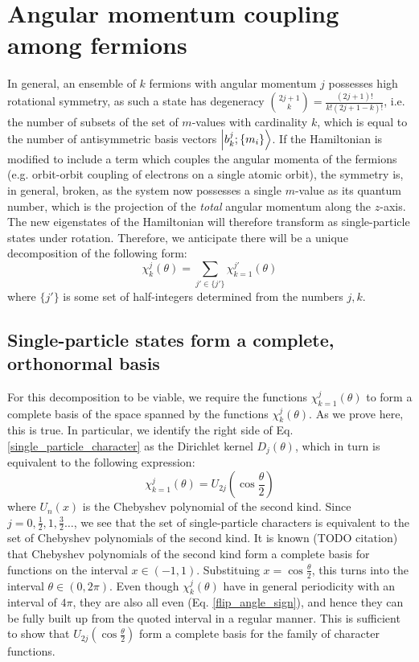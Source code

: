 \documentclass[12pt]{article}
\begin{document}
	\section{Angular momentum coupling among fermions}
	In general, an ensemble of $k$ fermions with angular momentum $j$ possesses high rotational symmetry, as such a state has degeneracy $\binom{2j+1}{k}=\frac{(2j+1)!}{k!(2j+1-k)!}$, i.e. the number of subsets of the set of $m$-values with cardinality $k$, which is equal to the number of antisymmetric basis vectors $\ket{b^j_k; \{m_i\}}$. If the Hamiltonian is modified to include a term which couples the angular momenta of the fermions (e.g. orbit\nobreakdash-orbit coupling of electrons on a single atomic orbit), the symmetry is, in general, broken, as the system now possesses a single $m$-value as its quantum number, which is the projection of the \textit{total} angular momentum along the $z$-axis. The new eigenstates of the Hamiltonian will therefore transform as single-particle states under rotation. Therefore, we anticipate there will be a unique decomposition of the following form:
	\begin{equation}
	\chi^j_k(\theta)=\sum_{j'\in\{j'\}}\chi^{j'}_{k=1}(\theta)
	\end{equation}
	where $\{j'\}$ is some set of half-integers determined from the numbers $j, k$.
	
	\subsection{Single-particle states form a complete, orthonormal basis}
	For this decomposition to be viable, we require the functions $\chi^j_{k=1}(\theta)$ to form a complete basis of the space spanned by the functions $\chi^j_k(\theta)$. As we prove here, this is true. In particular, we identify the right side of Eq. \ref{single_particle_character} as the Dirichlet kernel $D_j(\theta)$, which in turn is equivalent to the following expression:
	\begin{equation}
	\chi^j_{k=1}(\theta)=U_{2j}\left(\cos{\frac{\theta}{2}}\right)
	\end{equation}
	where $U_{n}(x)$ is the Chebyshev polynomial of the second kind. Since $j=0, \frac{1}{2}, 1, \frac{3}{2}\dots$, we see that the set of single-particle characters is equivalent to the set of Chebyshev polynomials of the second kind. It is known (TODO citation) that Chebyshev polynomials of the second kind form a complete basis for functions on the interval $x\in(-1,1)$. Substituing $x=\cos{\frac{\theta}{2}}$, this turns into the interval $\theta\in (0, 2\pi)$. Even though $\chi^j_k(\theta)$ have in general periodicity with an interval of $4\pi$, they are also all even (Eq. \ref{flip_angle_sign}), and hence they can be fully built up from the quoted interval in a regular manner. This is sufficient to show that $U_{2j}(\cos{\frac{\theta}{2}})$ form a complete basis for the family of character functions.
	
\end{document}
